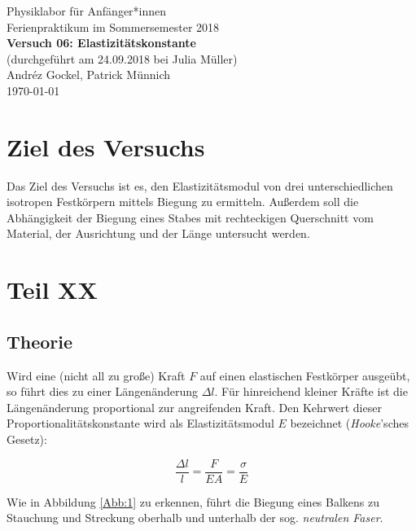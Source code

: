 \documentclass[11pt,a4paper]{article}
\begin{document}
{
\centering 
\large 
Physiklabor für Anf\"anger*innen \\
Ferienpraktikum im Sommersemester 2018 \\[4mm]
\textbf{\LARGE 
Versuch 06: Elastizitätskonstante
} \\[3mm]
(durchgef\"uhrt am 24.09.2018 bei Julia Müller) \\
Andréz Gockel, Patrick M\"unnich\\
\today \\[10mm]
}

\vspace{50pt}
\tableofcontents
\vspace{22pt}
\listoftables
\vspace{22pt}
\listoffigures
\pagebreak
\newpage

\section{Ziel des Versuchs}

Das Ziel des Versuchs ist es, den Elastizit\"atsmodul von drei unterschiedlichen isotropen Festk\"orpern mittels Biegung zu ermitteln. Au\ss erdem soll die Abh\"angigkeit der Biegung eines Stabes mit rechteckigen Querschnitt vom Material, der Ausrichtung und der L\"ange untersucht werden.

\section{Teil XX}

\subsection{Theorie}

Wird eine (nicht all zu gro\ss e) Kraft $F$ auf einen elastischen Festk\"orper ausge\"ubt, so f\"uhrt dies zu einer L\"angen\"anderung $\Delta l$. F\"ur hinreichend kleiner Kr\"afte ist die L\"angen\"anderung proportional zur angreifenden Kraft. Den Kehrwert dieser Proportionalit\"atskonstante wird als Elastizit\"atsmodul $E$ bezeichnet (\textit{Hooke}'sches Gesetz):

\begin{equation}
\frac{\Delta l}{l}=\frac{F}{EA}=\frac{\sigma}{E}\label{eq:elast}
\end{equation}

Wie in Abbildung \ref{Abb:1} zu erkennen, f\"uhrt die Biegung eines Balkens zu Stauchung und Streckung oberhalb und unterhalb der sog. \textit{neutralen Faser}.
\end{document}
